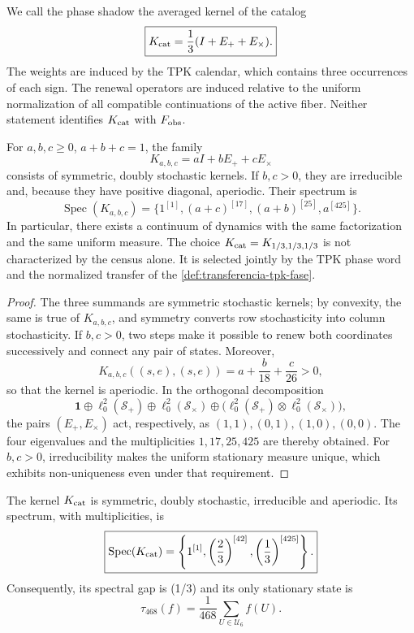 \begin{definition}
\label{def:nucleo-tritico-refresco}
We call the phase shadow the averaged kernel of the catalog
\[
 \boxed{
 K_{\rm cat}=\frac13(I+E_++E_\times).
 }
\]
The weights are induced by the TPK calendar, which contains three occurrences
of each sign. The renewal operators are induced relative to the
uniform normalization of all compatible continuations of the active
fiber. Neither statement identifies \(K_{\rm cat}\) with
\(F_{\rm obs}\).
\end{definition}

\begin{proposition}
\label{prop:familia-refrescos-abc}
For \(a,b,c\geq0\), \(a+b+c=1\), the family
\[
 K_{a,b,c}=aI+bE_++cE_\times
\]
consists of symmetric, doubly stochastic kernels. If \(b,c>0\),
they are irreducible and, because they have positive diagonal, aperiodic. Their spectrum is
\[
 \operatorname{Spec}(K_{a,b,c})=
 \{1^{[1]},(a+c)^{[17]},(a+b)^{[25]},a^{[425]}\}.
\]
In particular, there exists a continuum of dynamics with the same factorization and the
same uniform measure. The choice
\(K_{\rm cat}=K_{1/3,1/3,1/3}\) is not characterized by the census alone. It is
selected jointly by the TPK phase word and the normalized transfer
of the \cref{def:transferencia-tpk-fase}.
\end{proposition}

\begin{proof}
The three summands are symmetric stochastic kernels; by convexity, the
same is true of \(K_{a,b,c}\), and symmetry converts row stochasticity
into column stochasticity. If \(b,c>0\), two steps make it possible to renew
both coordinates successively and connect any pair of states. Moreover,
\[
 K_{a,b,c}((s,e),(s,e))=a+\frac b{18}+\frac c{26}>0,
\]
so that the kernel is aperiodic. In the orthogonal decomposition
\[
 \mathbf1\oplus\ell_0^2(\mathcal S_+)
 \oplus\ell_0^2(\mathcal S_\times)
 \oplus\bigl(\ell_0^2(\mathcal S_+)\otimes
              \ell_0^2(\mathcal S_\times)\bigr),
\]
the pairs \((E_+,E_\times)\) act, respectively, as
\((1,1),(0,1),(1,0),(0,0)\). The four eigenvalues and the
multiplicities \(1,17,25,425\) are thereby obtained. For \(b,c>0\), irreducibility makes
the uniform stationary measure unique, which exhibits non-uniqueness even under
that requirement.
\end{proof}

\begin{theorem}
\label{thm:dinamica-cociente-468}
The kernel \(K_{\rm cat}\) is symmetric, doubly stochastic, irreducible and aperiodic. Its spectrum, with multiplicities, is
\[
 \boxed{
 \operatorname{Spec}(K_{\rm cat})
 =\left\{1^{[1]},
 \left(\frac23\right)^{[42]},
 \left(\frac13\right)^{[425]}\right\}.
 }
\]
Consequently, its spectral gap is (1/3) and its only stationary state is
\[
 \boxed{
 \tau_{468}(f)=\frac1{468}\sum_{U\in\mathcal U_6}f(U).
 }
\]
\end{theorem}

